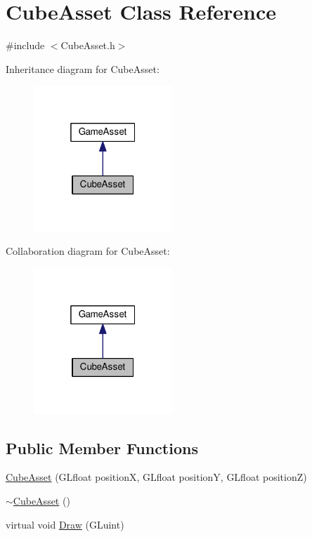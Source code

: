 \hypertarget{classCubeAsset}{}\section{Cube\+Asset Class Reference}
\label{classCubeAsset}


{\ttfamily \#include $<$Cube\+Asset.\+h$>$}



Inheritance diagram for Cube\+Asset\+:
\nopagebreak
\begin{figure}[H]
\begin{center}
\leavevmode
\includegraphics[width=148pt]{classCubeAsset__inherit__graph}
\end{center}
\end{figure}


Collaboration diagram for Cube\+Asset\+:
\nopagebreak
\begin{figure}[H]
\begin{center}
\leavevmode
\includegraphics[width=148pt]{classCubeAsset__coll__graph}
\end{center}
\end{figure}
\subsection*{Public Member Functions}
\begin{DoxyCompactItemize}
\item 
\hyperlink{classCubeAsset_ac506cff57e5656238caf95872582d976}{Cube\+Asset} (G\+Lfloat position\+X, G\+Lfloat position\+Y, G\+Lfloat position\+Z)
\item 
\hyperlink{classCubeAsset_ab3ab9a5da82cbf8537a28652410093b1}{$\sim$\+Cube\+Asset} ()
\item 
virtual void \hyperlink{classCubeAsset_a1af568486056e254ffcf98fd99947bfe}{Draw} (G\+Luint)
\end{DoxyCompactItemize}


